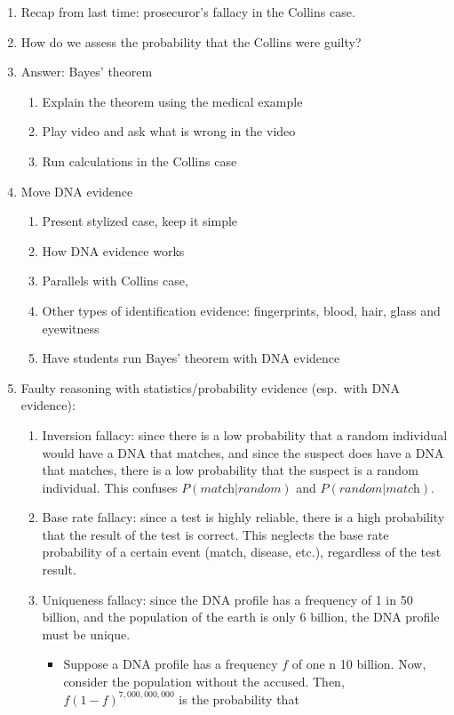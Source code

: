 \documentclass[16pt]{article}
\begin{document}
\begin{enumerate}
\item Recap from last time: prosecuror's fallacy in the Collins case.
\item How do we assess the probability that the Collins were guilty?
\item Answer: Bayes' theorem
\begin{enumerate}
\item Explain the theorem using the medical example
\item Play video and ask what is wrong in the video
\item Run calculations in the Collins case
\end{enumerate}

\item Move DNA evidence
\begin{enumerate}
\item Present stylized case, keep it simple
\item How DNA evidence works
\item Parallels with Collins case,
\item Other types of identification evidence: fingerprints, blood, hair, glass and eyewitness 
\item Have students run Bayes' theorem with DNA evidence 
\end{enumerate}
\item Faulty reasoning with statistics/probability evidence (esp.\ with DNA evidence):
\begin{enumerate}
\item Inversion fallacy: since there is a low probability that a random individual would have a DNA that matches, and since the suspect does have 
a DNA that matches, there is a low probability that the suspect is a random individual. This confuses $P(\textit{match}| \textit{random})$ and $P(\textit{random}| \textit{match})$.
\item Base rate fallacy: since a test is highly reliable, there is a high probability that the result of the test is correct. This neglects the base rate probability of a certain event (match, disease, etc.), regardless 
of the test result. 
\item Uniqueness fallacy: since the DNA profile has a frequency of 1 in 50 billion, and the population of the earth is only 6 billion, the DNA profile must be unique. 
\begin{itemize}
\item Suppose a DNA profile has a frequency $f$ of one n 10 billion. Now, consider the population without the accused. Then, $f(1-f)^{7,000,000,000}$ is the probability that 

\end{itemize}
\end{enumerate}
\end{enumerate}
\end{document}
